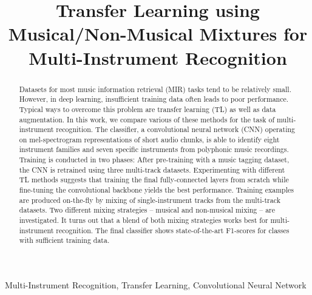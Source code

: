 \documentclass{article}
\title{Transfer Learning using Musical/Non-Musical Mixtures for Multi-Instrument Recognition}
\begin{document}
\ninept
%
\maketitle
%
\begin{abstract}
Datasets for most music information retrieval (MIR) tasks tend to be relatively small. However, in deep learning, insufficient training data often leads to poor performance. Typical ways to overcome this problem are transfer learning (TL) as well as data augmentation. In this work, we compare various of these methods for the task of multi-instrument recognition. The classifier, a convolutional neural network (CNN) operating on mel-spectrogram representations of short audio chunks, is able to identify eight instrument families and seven specific instruments from polyphonic music recordings. Training is conducted in two phases: After pre-training with a music tagging dataset, the CNN is retrained using three multi-track datasets. %
Experimenting with different TL methods suggests that training the final fully-connected layers from scratch while fine-tuning the convolutional backbone yields the best performance. Training examples are produced on-the-fly by mixing of single-instrument tracks from the multi-track datasets. Two different mixing strategies -- musical and non-musical mixing -- are investigated. It turns out that a blend of both mixing strategies works best for multi-instrument recognition. The final classifier shows state-of-the-art F1-scores for classes with sufficient training data.
\end{abstract}
%
\begin{keywords}
Multi-Instrument Recognition, Transfer Learning, Convolutional Neural Network
\end{keywords}
%
\end{document}
